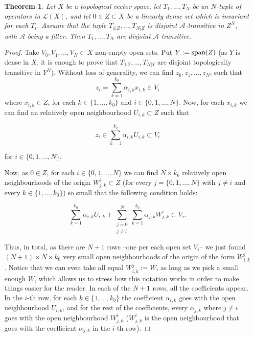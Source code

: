 \documentclass[11pt,reqno]{article}
\newtheorem{theorem}[statement]{Theorem}
\def\sp{\hbox{{\rm span}}}
\def\aa{\alpha}
\begin{document}
\begin{theorem} \label{thm:d-a-transitive-linear}
Let $X$ be a topological vector space, let $T_1,...,T_N$ be an $N$-tuple of operators in $\mathcal{L}(X)$, and let $0\in Z\subset X$ be a linearly dense set which is invariant for each $T_i$. Assume that the tuple $T_{1|Z},...,T_{N|Z}$ is disjoint $\mathcal{A}$-transitive  in $Z^N$, with $\mathcal{A}$ being a filter. Then $T_1,...,T_N$ are disjoint $\mathcal{A}$-transitive.
\end{theorem}
\begin{proof}
Take $V_0,V_1,...,V_N\subset X$ non-empty open sets. Put $Y:= \sp(Z)$ (as $Y$ is dense in $X$, it is enough to prove that $T_{1|Y},...,T_{N|Y}$ are disjoint topologically transitive in $Y^N$). Without loss of generality, we can find $z_0,z_1,..., z_N$, such that
\begin{equation*}
    z_i= \sum_{k=1}^{k_0} \aa_{i,k} x_{i,k} \in V_i
\end{equation*}
 where $x_{i,k}\in Z$, for each $k\in \{1,...,k_0\}$ and  $i\in \{0,1,...,N\}$. Now, for each $x_{i,k}$ we can find an relatively open neighbourhood $U_{i,k}\subset Z$ such that 


\begin{equation*}
  z_i\in   \sum_{k=1}^{k_0} \aa_{i,k} U_{i,k} \subset V_i
\end{equation*}

for $i\in \{0,1,...,N\}$.

Now, as $0\in Z$,  for each $i\in \{0,1,...,N\}$ we can find $N \times k_0$ relatively open neighbourhoods of the origin $W_{j,k}^i\subset Z$ (for every $j=\{0,1,...,N\} $ with $j\neq i$ and every $k\in \{1,...,k_0\}$) so small that the following condition holds:


\begin{equation}\label{eq:incl}
    \sum_{k=1}^{k_0} \aa_{i,k} U_{i,k} +
     \sum_{\substack{j=0 \\ j\neq i}}^N\sum_{k=1}^{k_0} \aa_{j,k} W_{j,k}^i \subset V_i.
\end{equation}

Thus, in total, as there are $N+1$ rows --one per each open set $V_i$-- we just found $(N+1)\times N \times k_0$ very small open neighbourhoods of the origin of the form $W_{i,k}^j$. Notice that  we can even take all equal $W_{i,k}^j:=W$, as long as we pick a small enough $W$, which allows us to stress how this notation works in order to make things easier for the reader.
In each of the $N+1$ rows, all the coefficients appear. In the $i$-th row, for each $k\in \{1,...,k_0\}$ the coefficient $\aa_{i,k}$ goes with the open neighbourhood $U_{i,k}$, and for the rest of the coefficients, every $\aa_{j,k}$ where $j\neq i$ goes with the open neighbourhood $W_{j,k}^i$ ($W_{j,k}^i$ is the open neighbourhood that goes with the coefficient $\aa_{j,k}$ in the $i$-th row).


\end{proof}
\end{document}
